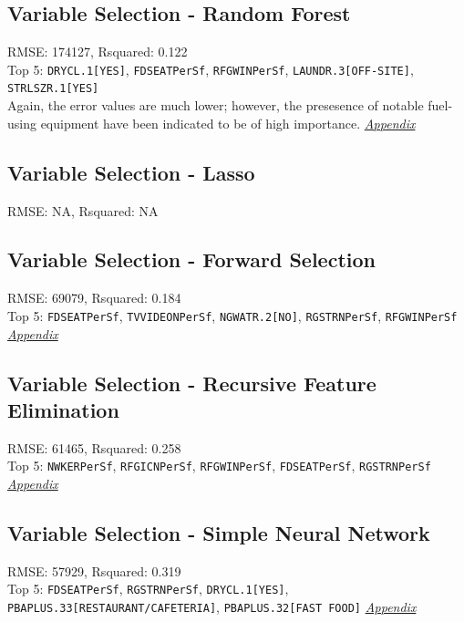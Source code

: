\subsection{Variable Selection - Random Forest}
RMSE: 174127, Rsquared: 0.122\\
Top 5: \lstinline{DRYCL.1[YES]}, \lstinline{FDSEATPerSf}, \lstinline{RFGWINPerSf}, \lstinline{LAUNDR.3[OFF-SITE]}, \lstinline{STRLSZR.1[YES]} 
\\[0.1in]
Again, the error values are much lower; however, the presesence of notable fuel-using equipment have been indicated to be of high importance. \textit{\hyperref[appendix:natural_gas:rf]{Appendix}}

\subsection{Variable Selection - Lasso}
RMSE: NA, Rsquared: NA\\

\subsection{Variable Selection - Forward Selection}
RMSE: 69079, Rsquared: 0.184\\
Top 5: \lstinline{FDSEATPerSf}, \lstinline{TVVIDEONPerSf}, \lstinline{NGWATR.2[NO]}, \lstinline{RGSTRNPerSf}, \lstinline{RFGWINPerSf}  \textit{\hyperref[appendix:natural_gas:lp]{Appendix}}

\subsection{Variable Selection - Recursive Feature Elimination}
RMSE: 61465, Rsquared: 0.258\\
Top 5: \lstinline{NWKERPerSf}, \lstinline{RFGICNPerSf}, \lstinline{RFGWINPerSf}, \lstinline{FDSEATPerSf}, \lstinline{RGSTRNPerSf}  \textit{\hyperref[appendix:natural_gas:rfe]{Appendix}}

\subsection{Variable Selection - Simple Neural Network}
RMSE: 57929, Rsquared: 0.319\\
Top 5: \lstinline{FDSEATPerSf}, \lstinline{RGSTRNPerSf}, \lstinline{DRYCL.1[YES]}, \lstinline{PBAPLUS.33[RESTAURANT/CAFETERIA]}, \lstinline{PBAPLUS.32[FAST FOOD]}  
\textit{\hyperref[appendix:natural_gas:snn]{Appendix}}


